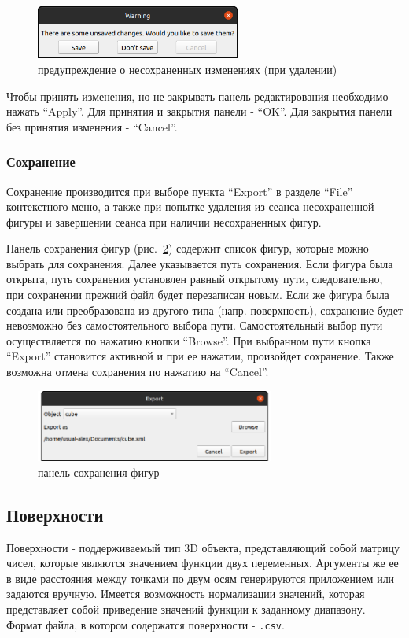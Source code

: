 \documentclass[12pt, a4paper, hidelinks]{article}
\begin{document}
\begin{figure}[htbp!]
	\centering
	\includegraphics[width=0.6\textwidth]{images/notsavedwarning.png}
	\caption{предупреждение о несохраненных изменениях (при удалении)}
	\label{not_saved_warning_delete}
\end{figure}

Чтобы принять изменения, но не закрывать панель редактирования необходимо нажать \enquote{Apply}. Для принятия и закрытия панели - \enquote{OK}. Для закрытия панели без принятия изменения - \enquote{Cancel}.

\subsubsection{Сохранение}
Сохранение производится при выборе пункта \enquote{Export} в разделе \enquote{File} контекстного меню, а также при попытке удаления из сеанса несохраненной фигуры и завершении сеанса при наличии несохраненных фигур.

Панель сохранения фигур (рис.~\ref{export}) содержит список фигур, которые можно выбрать для сохранения. Далее указывается путь сохранения. Если фигура была открыта, путь сохранения установлен равный открытому пути, следовательно, при сохранении прежний файл будет перезаписан новым. Если же фигура была создана или преобразована из другого типа (напр. поверхность), сохранение будет невозможно без самостоятельного выбора пути. Самостоятельный выбор пути осуществляется по нажатию кнопки \enquote{Browse}. При выбранном пути кнопка \enquote{Export} становится активной и при ее нажатии, произойдет сохранение. Также возможна отмена сохранения по нажатию на \enquote{Cancel}.
\begin{figure}[htbp!]
	\centering
	\includegraphics[width=0.7\textwidth]{images/export.png}
	\caption{панель сохранения фигур}
	\label{export}
\end{figure}

\subsection{Поверхности}
Поверхности - поддерживаемый тип 3D объекта, представляющий собой матрицу чисел, которые являются значением функции двух переменных. Аргументы же ее в виде расстояния между точками по двум осям генерируются приложением или задаются вручную. Имеется возможность нормализации значений, которая представляет собой приведение значений функции к заданному диапазону. Формат файла, в котором содержатся поверхности - \verb|.csv|.
\end{document}
